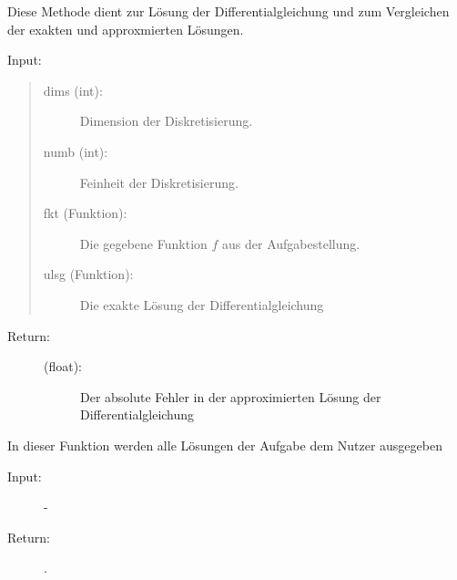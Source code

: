 \documentclass[letterpaper,10pt,ngerman, oneside, openright]{sphinxmanual}
\begin{document}
\begin{fulllineitems}
\label{\detokenize{index:aufg_5_2.loesg}}
Diese Methode dient zur Lösung der Differentialgleichung und zum Vergleichen der exakten
und approxmierten Lösungen.
\begin{description}
\item [{Input:}]
\end{description}
\begin{quote}
\begin{description}
\item[{dims (int):}] \leavevmode
Dimension der Diskretisierung.

\item[{numb (int):}] \leavevmode
Feinheit der Diskretisierung.

\item[{fkt (Funktion):}] \leavevmode
Die gegebene Funktion $f$ aus der Aufgabestellung.

\item[{ulsg (Funktion):}] \leavevmode
Die exakte Lösung der Differentialgleichung

\end{description}
\end{quote}
\begin{description}
\item[{Return:}] \leavevmode\begin{description}
\item[{(float):}] \leavevmode
Der absolute Fehler in der approximierten Lösung der Differentialgleichung

\end{description}

\end{description}

\end{fulllineitems}


\begin{fulllineitems}
\label{\detokenize{index:aufg_5_2.main}}
In dieser Funktion werden alle Lösungen der Aufgabe dem Nutzer ausgegeben
\begin{description}
\item [{Input:}] -
\end{description}
\begin{description}
\item [{Return:}] .
\end{description}
\end{fulllineitems}
\end{document}
